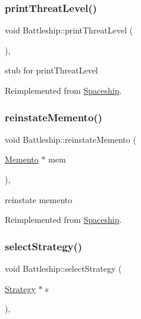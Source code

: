 \subsubsection{\texorpdfstring{print\+Threat\+Level()}{printThreatLevel()}}
{\footnotesize\ttfamily void Battleship\+::print\+Threat\+Level (\begin{DoxyParamCaption}{ }\end{DoxyParamCaption})\hspace{0.3cm}{\ttfamily [inline]}, {\ttfamily [virtual]}}

stub for print\+Threat\+Level 

Reimplemented from \hyperlink{classSpaceship_a8f16814f888a5a1423e5a491329cdb97}{Spaceship}.

\mbox{\label{classBattleship_a46f7920029ef4968db3a4429f0fb9372}} 
\subsubsection{\texorpdfstring{reinstate\+Memento()}{reinstateMemento()}}
{\footnotesize\ttfamily void Battleship\+::reinstate\+Memento (\begin{DoxyParamCaption}\item[{\hyperlink{classMemento}{Memento} $\ast$}]{mem }\end{DoxyParamCaption})\hspace{0.3cm}{\ttfamily [inline]}, {\ttfamily [virtual]}}

reinstate memento 

Reimplemented from \hyperlink{classSpaceship_ab075c869473344b6471c8e28ca7ea61e}{Spaceship}.

\mbox{\label{classBattleship_a2a729de36df2648305cb68c9779c9c2e}} 
\subsubsection{\texorpdfstring{select\+Strategy()}{selectStrategy()}}
{\footnotesize\ttfamily void Battleship\+::select\+Strategy (\begin{DoxyParamCaption}\item[{\hyperlink{classStrategy}{Strategy} $\ast$}]{s }\end{DoxyParamCaption})\hspace{0.3cm}{\ttfamily [inline]}, {\ttfamily [virtual]}}

